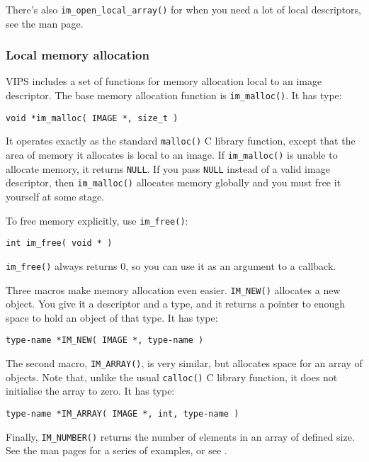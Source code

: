 There's also \verb+im_open_local_array()+ for when you need a lot of local
descriptors, see the man page.

\subsubsection{Local memory allocation}
\label{sec:malloc}

VIPS includes a set of functions for memory allocation local to an image
descriptor. The base memory allocation function is \verb+im_malloc()+. It
has type:

\begin{verbatim}
void *im_malloc( IMAGE *, size_t )
\end{verbatim}

It operates exactly as the standard \verb+malloc()+ C library function,
except that the area of memory it allocates is local to an image.
If \verb+im_malloc()+ is unable to allocate memory, it returns
\verb+NULL+. If you pass \verb+NULL+ instead of a valid image descriptor,
then \verb+im_malloc()+ allocates memory globally and you must free it
yourself at some stage.

To free memory explicitly, use \verb+im_free()+:

\begin{verbatim}
int im_free( void * )
\end{verbatim}

\noindent
\verb+im_free()+ always returns 0, so you can use it as an argument to a
callback.

Three macros make memory allocation even easier. \verb+IM_NEW()+ allocates
a new object. You give it a descriptor and a type, and it returns a pointer
to enough space to hold an object of that type. It has type:

\begin{verbatim}
type-name *IM_NEW( IMAGE *, type-name )
\end{verbatim}

The second macro, \verb+IM_ARRAY()+, is very similar, but allocates
space for an array of objects. Note that, unlike the usual \verb+calloc()+
C library function, it does not initialise the array to zero. It has type:

\begin{verbatim}
type-name *IM_ARRAY( IMAGE *, int, type-name )
\end{verbatim}

Finally, \verb+IM_NUMBER()+ returns the number of elements in an array of
defined size.  See the man pages for a series of examples, or
see .

